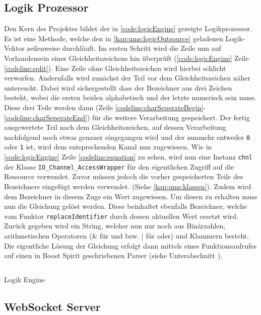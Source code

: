 \subsection{Logik Prozessor}\label{kap:ums:logicProcessor}
Den Kern des Projektes bildet der in \autoref{code:logicEngine} gezeigte Logikprozessor. Es ist eine Methode, welche den in \autoref{kap:ums:logicOutsource} geladenen Logik-Vektor zeilenweise durchläuft. Im ersten Schritt wird die Zeile nun auf Vorhandensein eines Gleichheitszeichens hin überprüft (\autoref{code:logicEngine} Zeile \ref{codeline:split}). Eine Zeile ohne Gleichheitszeichen wird hierbei schlicht verworfen. Andernfalls wird zunächst der Teil vor dem Gleichheitszeichen näher untersucht. Dabei wird sichergestellt dass der Bezeichner aus drei Zeichen besteht, wobei die ersten beiden alphabetisch und der letzte numerisch sein muss. Diese drei Teile werden dann (Zeile \ref{codeline:charSeperateBegin}-\ref{codeline:charSeperateEnd}) für die weitere Verarbeitung gespeichert. Der fertig ausgewertete Teil nach dem Gleichheitszeichen, auf dessen Verarbeitung nachfolgend noch etwas genauer eingegangen wird und der nunmehr entweder \texttt{0} oder \texttt{1} ist, wird dem entsprechenden Kanal nun zugewiesen. Wie in \autoref{code:logicEngine} Zeile \ref{codeline:equation} zu sehen, wird nun eine Instanz \texttt{chnl} der Klasse \texttt{IO\_Channel\_AccessWrapper} für den eigentlichen Zugriff auf die Ressource verwendet. Zuvor müssen jedoch die vorher gespeicherten Teile des Bezeichners eingefügt werden verwendet. (Siehe \autoref{kap:ums:klassen}). 
Zudem wird dem Bezeichner in diesem Zuge ein Wert zugewiesen. Um diesen zu erhalten muss nun die Gleichung gelöst werden. Diese beinhaltet ebenfalls Bezeichner, welche vom Funktor \texttt{replaceIdentifier} durch dessen aktuellen Wert ersetzt wird. Zurück gegeben wird ein String, welcher nun nur noch aus Binärzahlen, arithmetischen Operatoren (\& für und bzw. | für oder) und Klammern besteht. Die eigentliche Lösung der Gleichung erfolgt dann mittels eines Funktionsaufrufes auf einen in Boost Spirit geschriebenen Parser (siehe Unterabschnitt ). 
\begin{listing}[H]

	\inputminted[numbersep=1pt,linenos=true, mathescape, numbers=left, fontsize=\scriptsize,frame=single, firstline=186,lastline=222]{c}{./code/main-klassenstruktur.cpp}
	\caption{Logik Engine}
	\label{code:logicEngine}
\end{listing}
\subsection{WebSocket Server}\label{chp:ums:websockserver}
